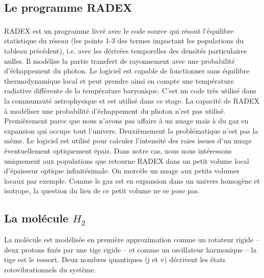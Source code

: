 \documentclass[10pt, a4paper]{report}
\numberwithin{equation}{subsection}
\begin{document}



\subsection{Le programme RADEX}
RADEX\textsuperscript{\cite{RADEX}} est un programme livré avec le code source qui résout l'équilibre statistique du réseau (les points 1-3 des termes impactant les populations du tableau précédent), i.e. avec les dérivées temporelles des densités particulaires nulles. Il modélise la partie transfert de rayonnement avec une probabilité d'échappement du photon. Le logiciel est capable de fonctionner sans équilibre thermodynamique local et peut prendre ainsi en compte une température radiative différente de la température baryonique. C'est un code très utilisé dans la communauté astrophysique et est utilisé dans ce stage. La capacité de RADEX à modéliser une probabilité d'échappement du photon n'est pas utilisé. Premièrement parce que nous n'avons pas affaire à un nuage mais à du gaz en expansion qui occupe tout l'univers. Deuxièmement la problématique n'est pas la même. Le logiciel est utilisé pour calculer l'intensité des raies issues d'un nuage éventuellement optiquement épais. Dans notre cas, nous nous intéressons uniquement aux populations que retourne RADEX dans un petit volume local d'épaisseur optique infinitésimale. On morcèle un nuage aux petits volumes locaux par exemple. Comme le gaz est en expansion dans un univers homogène et isotrope, la question du lieu de ce petit volume ne se pose pas.     
\subsection{La molécule $H_2$}
La molécule est modélisée en première approximation comme un rotateur rigide -- deux protons fixés par une tige rigide -- et comme un oscillateur harmonique -- la tige est le ressort. Deux nombres quantiques (j et v) décrivent les états rotovibrationnels du système.  
\end{document}
